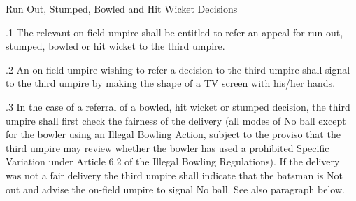 \documentclass[12pt]{article}
\begin{document}
\vspace{\baselineskip}
{\fontsize{9pt}{10.8pt} \tabto{0.39in} {\fontsize{8pt}{9.6pt}\selectfont Run Out, Stumped, Bowled and Hit Wicket Decisions\par}\par}\par


\vspace{\baselineskip}
\begin{adjustwidth}{0.5in}{0.15in}
{\fontsize{9pt}{10.8pt}.1 \tabto{0.49in} The relevant on-field umpire shall be entitled to refer an appeal for run-out, stumped, bowled or hit wicket to the third umpire.\par}\par

\end{adjustwidth}


\vspace{\baselineskip}
\begin{adjustwidth}{0.5in}{0.25in}
{\fontsize{9pt}{10.8pt}.2 \tabto{0.49in} An on-field umpire wishing to refer a decision to the third umpire shall signal to the third umpire by making the shape of a TV screen with his/her hands.\par}\par

\end{adjustwidth}


\vspace{\baselineskip}
\begin{adjustwidth}{0.5in}{0.14in}
{\fontsize{9pt}{10.8pt}.3 \tabto{0.49in} In the case of a referral of a bowled, hit wicket or stumped decision, the third umpire shall first check the fairness of the delivery (all modes of No ball except for the bowler using an Illegal Bowling Action, subject to the proviso that the third umpire may review whether the bowler has used a prohibited Specific Variation under Article 6.2 of the Illegal Bowling Regulations). If the delivery was not a fair delivery the third umpire shall indicate that the batsman is Not out and advise the on-field umpire to signal No ball. See also paragraph below.\par}\par

\end{adjustwidth}


\vspace{\baselineskip}

\vspace{\baselineskip}
\end{document}
